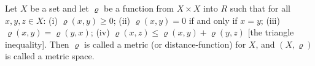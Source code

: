 Let $X$ be a set and let $\varrho$ be a function from $X \times X$ into $R$ such that for all $x, y, z \in X$:
(i) $\varrho(x, y) \geq 0$;
(ii) $\varrho(x, y) = 0$ if and only if $x = y$;
(iii) $\varrho(x, y) = \varrho(y, x)$;
(iv) $\varrho(x, z) \leq \varrho(x, y) + \varrho(y, z)$ [the triangle inequality].
Then $\varrho$ is called a metric (or distance-function) for $X$, and $(X, \varrho)$ is called a metric space.